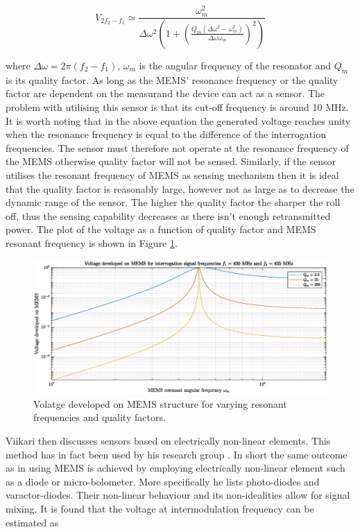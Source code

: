 \documentclass[11pt,a4paper]{article}
\begin{document}
\begin{equation}
V_{2f_2-f_1} \simeq \frac{\omega_m^2}{\Delta \omega^2 \left(1+\left( \frac{Q_m \left(\Delta \omega^2 - \omega_m^2 \right)}{\Delta \omega \omega_m} \right)^2 \right)}
\end{equation}

where $\Delta \omega = 2\pi (f_2-f_1)$, $\omega_m$ is the angular frequency of the resonator and $Q_m$ is its quality factor. As long as the MEMS' resonance frequency or the quality factor are dependent on the measurand the device can act as a sensor. The problem with utilising this sensor is that its cut-off frequency is around 10 MHz. It is worth noting that in the above equation the generated voltage reaches unity when the resonance frequency is equal to the difference of the interrogation frequencies. The sensor must therefore not operate at the resonance frequency of the MEMS otherwise quality factor will not be sensed. Similarly, if the sensor utilises the resonant frequency of MEMS as sensing mechanism then it is ideal that the quality factor is reasonably large, however not as large as to decrease the dynamic range of the sensor. The higher the quality factor the sharper the roll off, thus the sensing capability decreases as there isn't enough retransmitted power. The plot of the voltage as a function of quality factor and MEMS resonant frequency is shown in Figure \ref{fig:vol}.


\begin{figure}[h]
\centering
\includegraphics[width=1\textwidth]{voltage.eps}
\caption{Volatge developed on MEMS structure for varying resonant frequencies and quality factors.\label{fig:vol}}
\end{figure}

Viikari then discusses sensors based on electrically non-linear elements. This method has in fact been used by his research group \cite{icp1,icp2,icp3,icp4}. In short the same outcome as in using MEMS is achieved by employing electrically non-linear element such as a diode or micro-bolometer. More specifically he lists photo-diodes and varactor-diodes. Their non-linear behaviour and its non-idealities allow for signal mixing. It is found that the voltage at intermodulation frequency can be estimated as
\end{document}
